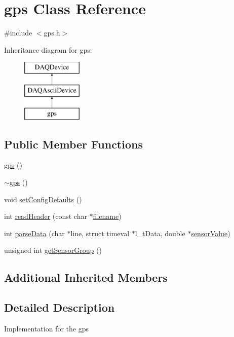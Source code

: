 \hypertarget{classgps}{\section{gps Class Reference}
\label{classgps}
}


{\ttfamily \#include $<$gps.\-h$>$}

Inheritance diagram for gps\-:\begin{figure}[H]
\begin{center}
\leavevmode
\includegraphics[height=3.000000cm]{classgps}
\end{center}
\end{figure}
\subsection*{Public Member Functions}
\begin{DoxyCompactItemize}
\item 
\hyperlink{classgps_a13b491233eeef0a9934e8d86db776949}{gps} ()
\item 
\hyperlink{classgps_a2a5bb1cd2bb43b8d2a1cacc7ab34f46e}{$\sim$gps} ()
\item 
void \hyperlink{classgps_a55f655de8f378da212ec92fd3283bb83}{set\-Config\-Defaults} ()
\item 
int \hyperlink{classgps_a37400cebc4929e7b30305c1b361f6309}{read\-Header} (const char $\ast$\hyperlink{classDAQDevice_a7f9cda7cf5b41f6b134c313477e9644b}{filename})
\item 
int \hyperlink{classgps_a8dc22ee8632e62c0547a782708b0238a}{parse\-Data} (char $\ast$line, struct timeval $\ast$l\-\_\-t\-Data, double $\ast$\hyperlink{classDAQDevice_ad148188c57598fdf4fd4c1c333aeb0d8}{sensor\-Value})
\item 
unsigned int \hyperlink{classgps_a3735ebac4b699c531c8ec24015bc9c89}{get\-Sensor\-Group} ()
\end{DoxyCompactItemize}
\subsection*{Additional Inherited Members}


\subsection{Detailed Description}
Implementation for the gps 

